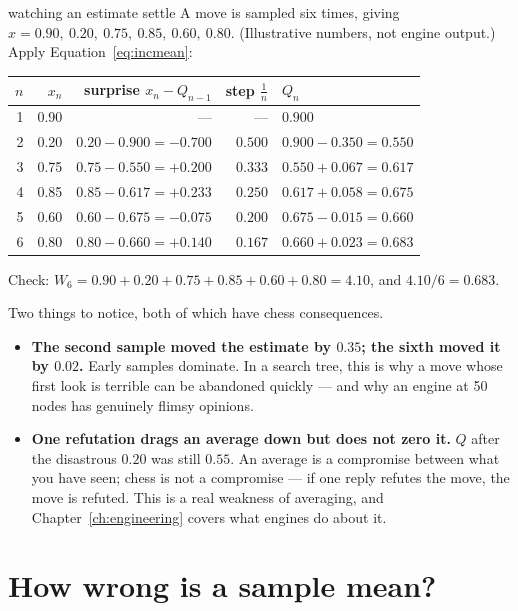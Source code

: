 \begin{worked}{watching an estimate settle}
A move is sampled six times, giving $x = 0.90,\ 0.20,\ 0.75,\ 0.85,\ 0.60,\ 0.80$.
(Illustrative numbers, not engine output.) Apply Equation~\eqref{eq:incmean}:

\begin{center}
\begin{tabular}{@{}rrrrl@{}}
\toprule
$n$ & $x_n$ & surprise $x_n - Q_{n-1}$ & step $\tfrac1n$ & $Q_n$ \\
\midrule
1 & 0.90 & --- & --- & $0.900$ \\
2 & 0.20 & $0.20-0.900=-0.700$ & $0.500$ & $0.900 - 0.350 = 0.550$ \\
3 & 0.75 & $0.75-0.550=+0.200$ & $0.333$ & $0.550 + 0.067 = 0.617$ \\
4 & 0.85 & $0.85-0.617=+0.233$ & $0.250$ & $0.617 + 0.058 = 0.675$ \\
5 & 0.60 & $0.60-0.675=-0.075$ & $0.200$ & $0.675 - 0.015 = 0.660$ \\
6 & 0.80 & $0.80-0.660=+0.140$ & $0.167$ & $0.660 + 0.023 = 0.683$ \\
\bottomrule
\end{tabular}
\end{center}

Check: $W_6 = 0.90+0.20+0.75+0.85+0.60+0.80 = 4.10$, and $4.10/6 = 0.683$. \checkmark

Two things to notice, both of which have chess consequences.
\begin{itemize}
\item \textbf{The second sample moved the estimate by $0.35$; the sixth moved it by $0.02$.}
  Early samples dominate. In a search tree, this is why a move whose first look is terrible
  can be abandoned quickly --- and why an engine at 50 nodes has genuinely flimsy opinions.
\item \textbf{One refutation drags an average down but does not zero it.} $Q$ after the
  disastrous $0.20$ was still $0.55$. An average is a compromise between what you have seen;
  chess is not a compromise --- if one reply refutes the move, the move is refuted. This is
  a real weakness of averaging, and Chapter~\ref{ch:engineering} covers what engines do
  about it.
\end{itemize}
\end{worked}

\section{How wrong is a sample mean?}


